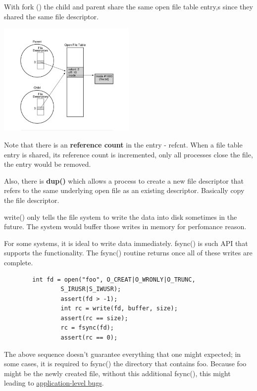    

    With fork () the child and parent share the same open file table entry,s
    since they shared the same file descriptor.

    \includegraphics[width=0.5\textwidth]{chapters/Persistence/persistence/share_open_file_table_entry.png}

    Note that there is an \textbf{reference count} in the entry - refcnt.
    When a file table entry is shared, its reference count is incremented,
    only all processes close the file, the entry would be removed.


    Also, there is \textbf{dup()} which allows a process to create a new file descriptor that refers 
    to the same underlying open file as an existing descriptor. Basically copy the file descriptor.



    write() only tells the file system to write the data into disk sometimes in the future.
    The system would buffer those writes in memory for perfomance reason.

    For some systems, it is ideal to write data immediately. fsync() is such API that supports the 
    functionality. The fsync() routine returns once all of these writes are complete.

    \begin{lstlisting}
        int fd = open("foo", O_CREAT|O_WRONLY|O_TRUNC,
                S_IRUSR|S_IWUSR);
                assert(fd > -1);
                int rc = write(fd, buffer, size);
                assert(rc == size);
                rc = fsync(fd);
                assert(rc == 0);
    \end{lstlisting}

    The above sequence doesn't guarantee everything that one might expected;
    in some cases, it is required to fsync() the directory that contains foo.
    Because foo might be the newly created file, without this additional 
    fsync(), this might leading to \underline{application-level bugs}.


